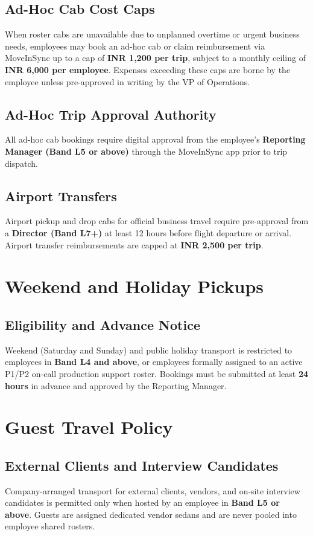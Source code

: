 \documentclass[11pt,a4paper]{article}
\begin{document}
\subsection{Ad-Hoc Cab Cost Caps}
When roster cabs are unavailable due to unplanned overtime or urgent business needs, employees may book an ad-hoc cab or claim reimbursement via MoveInSync up to a cap of \textbf{INR 1,200 per trip}, subject to a monthly ceiling of \textbf{INR 6,000 per employee}. Expenses exceeding these caps are borne by the employee unless pre-approved in writing by the VP of Operations.

\subsection{Ad-Hoc Trip Approval Authority}
All ad-hoc cab bookings require digital approval from the employee's \textbf{Reporting Manager (Band L5 or above)} through the MoveInSync app prior to trip dispatch.

\subsection{Airport Transfers}
Airport pickup and drop cabs for official business travel require pre-approval from a \textbf{Director (Band L7+)} at least 12 hours before flight departure or arrival. Airport transfer reimbursements are capped at \textbf{INR 2,500 per trip}.

\section{Weekend and Holiday Pickups}
\subsection{Eligibility and Advance Notice}
Weekend (Saturday and Sunday) and public holiday transport is restricted to employees in \textbf{Band L4 and above}, or employees formally assigned to an active P1/P2 on-call production support roster. Bookings must be submitted at least \textbf{24 hours} in advance and approved by the Reporting Manager.

\section{Guest Travel Policy}
\subsection{External Clients and Interview Candidates}
Company-arranged transport for external clients, vendors, and on-site interview candidates is permitted only when hosted by an employee in \textbf{Band L5 or above}. Guests are assigned dedicated vendor sedans and are never pooled into employee shared rosters.
\end{document}
